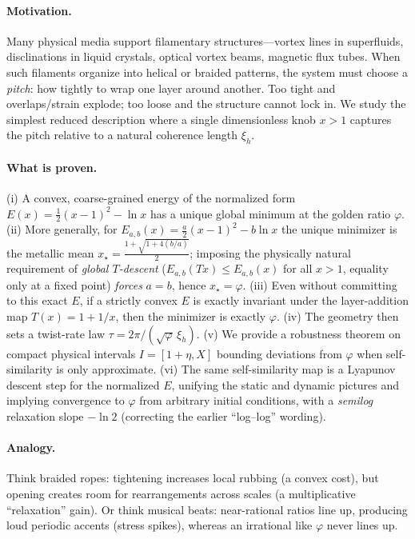 \documentclass[11pt]{article}
\theoremstyle{remark}
\theoremstyle{definition}
\newcommand{\ph}{\varphi}
\begin{document}
\paragraph{Motivation.} Many physical media support filamentary structures---vortex lines in superfluids, disclinations in liquid crystals, optical vortex beams, magnetic flux tubes. When such filaments organize into helical or braided patterns, the system must choose a \emph{pitch}: how tightly to wrap one layer around another. Too tight and overlaps/strain explode; too loose and the structure cannot lock in. We study the simplest reduced description where a single dimensionless knob $x>1$ captures the pitch relative to a natural coherence length $\xi_h$.

\paragraph{What is proven.} (i) A convex, coarse-grained energy of the normalized form $E(x)=\tfrac12(x-1)^2-\ln x$ has a unique global minimum at the golden ratio $\ph$. (ii) More generally, for $E_{a,b}(x)=\tfrac{a}{2}(x-1)^2-b\ln x$ the unique minimizer is the metallic mean $x_\star=\frac{1+\sqrt{1+4(b/a)}}2$; imposing the physically natural requirement of \emph{global $T$-descent} ($E_{a,b}(Tx)\le E_{a,b}(x)$ for all $x>1$, equality only at a fixed point) \emph{forces} $a=b$, hence $x_\star=\ph$. (iii) Even without committing to this exact $E$, if a strictly convex $E$ is exactly invariant under the layer-addition map $T(x)=1+1/x$, then the minimizer is exactly $\ph$. (iv) The geometry then sets a twist-rate law $\tau=2\pi/(\sqrt{\ph}\,\xi_h)$. (v) We provide a robustness theorem on compact physical intervals $I=[1+\eta,X]$ bounding deviations from $\ph$ when self-similarity is only approximate. (vi) The same self-similarity map is a Lyapunov descent step for the normalized $E$, unifying the static and dynamic pictures and implying convergence to $\varphi$ from arbitrary initial conditions, with a \emph{semilog} relaxation slope $-\ln 2$ (correcting the earlier “log–log” wording).

\paragraph{Analogy.} Think braided ropes: tightening increases local rubbing (a convex cost), but opening creates room for rearrangements across scales (a multiplicative ``relaxation'' gain). Or think musical beats: near-rational ratios line up, producing loud periodic accents (stress spikes), whereas an irrational like $\ph$ never lines up.
\end{document}
